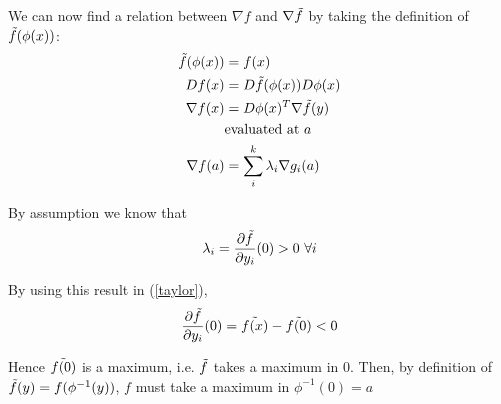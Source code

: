 \begin{homeworkProblem}
We can now find a relation between $\nabla f$ and $\nabla \Tilde{f}$ by taking the definition of $\Tilde{f}(\phi(x))$:
\begin{equation}
    \begin{split}
        \Tilde{f}(\phi(x)) & = f(x) \\
        Df(x) & = D\Tilde{f}(\phi(x))D\phi(x) \\
        \nabla f(x) & = D\phi(x)^T \nabla \Tilde{f}(y)\\
        & \text{evaluated at} \ a \\
        \nabla f(a) & = \sum_i^{k} \lambda_i \nabla g_i(a)
    \end{split}
\end{equation}

By assumption we know that 
\begin{equation}
    \lambda_i =  \frac{\partial \Tilde{f}}{\partial y_i}(0) > 0 \ \forall i
\end{equation}

By using this result in (\ref{taylor}),
\begin{equation}
    \begin{split}
        \frac{\partial \Tilde{f}}{\partial y_i}(0) = \Tilde{f(x)} - \Tilde{f(0)} < 0
    \end{split}
\end{equation}

Hence $\Tilde{f(0)}$ is a maximum, i.e. $\Tilde{f}$ takes a maximum in $0$. Then, by definition of $\Tilde{f}(y) = f(\phi^{-1}(y))$, $f$ must take a maximum in $\phi^{-1}(0) = a$
\end{homeworkProblem}



